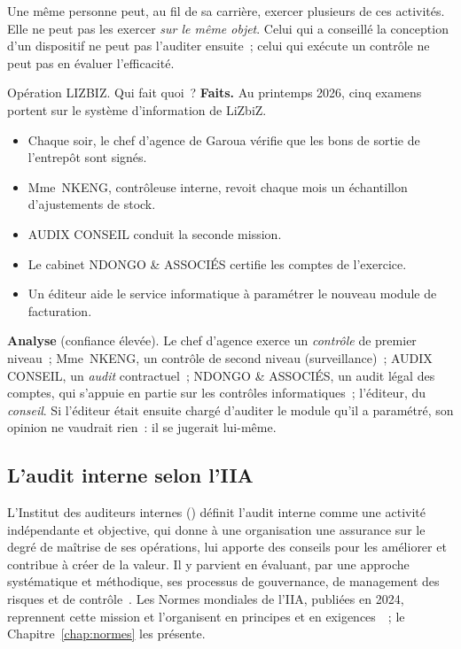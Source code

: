 Une même personne peut, au fil de sa carrière, exercer plusieurs de ces
activités. Elle ne peut pas les exercer \emph{sur le même objet}. Celui qui
a conseillé la conception d'un dispositif ne peut pas l'auditer ensuite~;
celui qui exécute un contrôle ne peut pas en évaluer l'efficacité.

\begin{boxscenario}{Opération LIZBIZ. Qui fait quoi~?}
\textbf{Faits.} Au printemps 2026, cinq examens portent sur le
système d'information de LiZbiZ.
\begin{itemize}
    \item Chaque soir, le chef d'agence de Garoua vérifie que les bons de
          sortie de l'entrepôt sont signés.
    \item Mme~NKENG, contrôleuse interne, revoit chaque mois un échantillon
          d'ajustements de stock.
    \item AUDIX CONSEIL conduit la seconde mission.
    \item Le cabinet NDONGO \& ASSOCIÉS certifie les comptes de l'exercice.
    \item Un éditeur aide le service informatique à paramétrer le nouveau
          module de facturation.
\end{itemize}

\textbf{Analyse} (confiance élevée). Le chef d'agence exerce un
\emph{contrôle} de premier niveau~; Mme~NKENG, un contrôle de second niveau
(surveillance)~; AUDIX CONSEIL, un \emph{audit} contractuel~; NDONGO \&
ASSOCIÉS, un audit légal des comptes, qui s'appuie en partie sur les
contrôles informatiques~; l'éditeur, du \emph{conseil}. Si l'éditeur était
ensuite chargé d'auditer le module qu'il a paramétré, son opinion ne
vaudrait rien~: il se jugerait lui-même.
\end{boxscenario}

\subsection{L'audit interne selon l'IIA}

L'Institut des auditeurs internes () définit l'audit interne
comme une activité indépendante et objective, qui donne à une organisation
une assurance sur le degré de maîtrise de ses opérations, lui apporte des
conseils pour les améliorer et contribue à créer de la valeur. Il y parvient
en évaluant, par une approche systématique et méthodique, ses processus de
gouvernance, de management des risques et de contrôle~\cite{iia2017cripp}.
Les Normes mondiales de l'IIA, publiées en 2024, reprennent cette mission
et l'organisent en principes et en exigences~\cite{iia2024gias}~; le
Chapitre~\ref{chap:normes} les présente.

